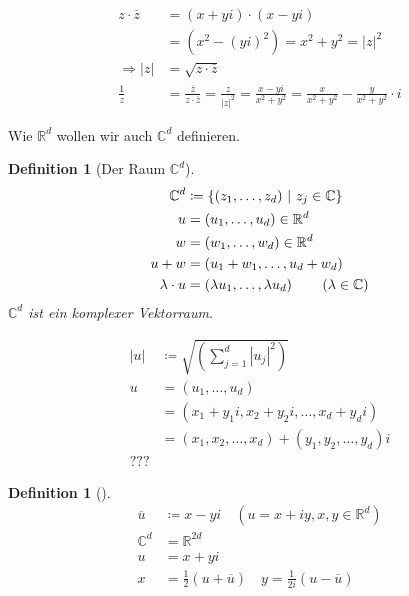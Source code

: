 \documentclass[11pt, twoside, a4paper]{article}
\theoremstyle{plain}
\newtheorem{definition}[blockelement]{Definition}
\newcommand{\set}[1]{\left\{#1\right\}}
\newcommand{\pair}[1]{\left(#1\right)}
\newcommand{\abs}[1]{\left\lvert#1\right\rvert}
\newcommand{\impl}[0]{\Rightarrow{}}
\newcommand{\definedas}[0]{\coloneqq}
\newcommand{\R}{\mathbb{R}}
\newcommand{\C}{\mathbb{C}}
\begin{document}
    \begin{align*}
        z\cdot\overline{z} &= (x+yi) \cdot (x-yi)\\
        &= (x^2-(yi)^2) = x^2+y^2 = \abs{z}^2\\
        \impl \abs{z} &= \sqrt{z\cdot\overline{z}}\\
        \frac{1}{z} &= \frac{\overline{z}}{z\cdot\overline{z}} = \frac{z}{\abs{z}^2} = \frac{x-yi}{x^2+y^2} = \frac{x}{x^2+y^2} - \frac{y}{x^2+y^2}\cdot i
    \end{align*}

    \newpage


    \marginnote{[21. Dez]}

    Wie $\R^d$ wollen wir auch $\C^d$ definieren.

    \begin{definition}[Der Raum $\C^d$]
        \begin{align*}
            \C^d &\definedas \set{\pair{z_1, \dots, z_d} ~\middle | ~ z_j \in\C}\\
            u &= \pair{u_1, \dots, u_d} \in\R^d\\
            w &= \pair{w_1, \dots, w_d} \in\R^d\\
            u+w &= \pair{u_1+w_1,\dots,u_d+w_d}\\
            \lambda\cdot u &= \pair{\lambda u_1,\dots,\lambda u_d}\tag{$\lambda\in\C$}
        \end{align*}
        $\C^d$ ist ein komplexer Vektorraum.

        \begin{align*}
            \abs{u} &\definedas \sqrt{\pair{\sum_{j=1}^{d} \abs{u_j}^2}}\tag{Euklidische Länge}\\
            u &= \pair{u_1, \dots, u_d}\\
            &= \pair{x_1+y_1i, x_2 + y_2 i,\dots, x_d + y_d i}\\
            &= \pair{x_1, x_2,\dots,x_d} + \pair{y_1,y_2,\dots,y_d}i\\
            ???
        \end{align*}
    \end{definition}

    \begin{definition}[]
        \begin{align*}
            \overline{u} &\definedas x - yi\quad (u=x+iy, x,y\in\R^d)\\
            \C^d &= \R^{2d}\\[10pt]
            u &= x + yi\\
            x &= \frac{1}{2}\pair{u+\overline{u}}\quad y = \frac{1}{2i}\pair{u-\overline{u}}
        \end{align*}
    \end{definition}
\end{document}

